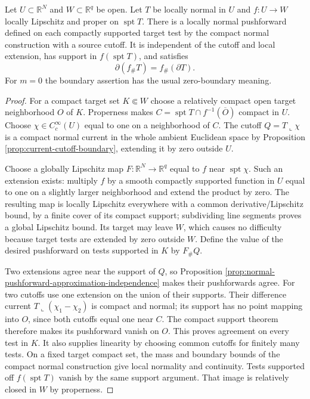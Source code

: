 \begin{lemma}\label{lem:local-proper-normal-pushforward}
Let $U\subset\mathbb R^N$ and $W\subset\mathbb R^q$ be open. Let $T$ be locally normal in $U$ and $f:U\to W$ locally Lipschitz and proper on $\operatorname{spt}T$. There is a locally normal pushforward defined on each compactly supported target test by the compact normal construction with a source cutoff. It is independent of the cutoff and local extension, has support in $f(\operatorname{spt}T)$, and satisfies
\[
 \partial(f_\#T)=f_\#(\partial T).
\]
For $m=0$ the boundary assertion has the usual zero-boundary meaning.
\end{lemma}
\begin{proof}
For a compact target set $K\Subset W$ choose a relatively compact open target neighborhood $O$ of $K$. Properness makes $C=\operatorname{spt}T\cap f^{-1}(\overline O)$ compact in $U$. Choose $\chi\in C_c^\infty(U)$ equal to one on a neighborhood of $C$. The cutoff $Q=T\llcorner\chi$ is a compact normal current in the whole ambient Euclidean space by Proposition \ref{prop:current-cutoff-boundary}, extending it by zero outside $U$.

Choose a globally Lipschitz map $F:\mathbb R^N\to\mathbb R^q$ equal to $f$ near $\operatorname{spt}\chi$. Such an extension exists: multiply $f$ by a smooth compactly supported function in $U$ equal to one on a slightly larger neighborhood and extend the product by zero. The resulting map is locally Lipschitz everywhere with a common derivative/Lipschitz bound, by a finite cover of its compact support; subdividing line segments proves a global Lipschitz bound. Its target may leave $W$, which causes no difficulty because target tests are extended by zero outside $W$. Define the value of the desired pushforward on tests supported in $K$ by $F_\#Q$.

Two extensions agree near the support of $Q$, so Proposition \ref{prop:normal-pushforward-approximation-independence} makes their pushforwards agree. For two cutoffs use one extension on the union of their supports. Their difference current $T\llcorner(\chi_1-\chi_2)$ is compact and normal; its support has no point mapping into $O$, since both cutoffs equal one near $C$. The compact support theorem therefore makes its pushforward vanish on $O$. This proves agreement on every test in $K$. It also supplies linearity by choosing common cutoffs for finitely many tests. On a fixed target compact set, the mass and boundary bounds of the compact normal construction give local normality and continuity. Tests supported off $f(\operatorname{spt}T)$ vanish by the same support argument. That image is relatively closed in $W$ by properness.


\end{proof}

